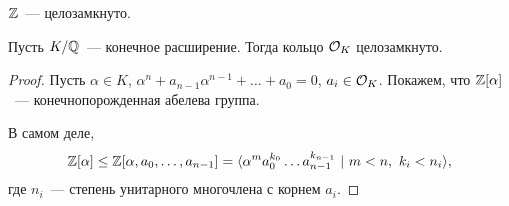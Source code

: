  	\begin{example}
 		$\mathbb{Z}$~--- целозамкнуто. 
 	\end{example}

 	\begin{theorem} 
 		Пусть $K/\mathbb{Q}$~--- конечное расширение. Тогда кольцо $\mathcal{O}_{K}$ целозамкнуто. 
 	\end{theorem}
 	\begin{proof}
 		Пусть $\alpha \in K$, $\alpha^n + a_{n - 1}\alpha^{n - 1} + \ldots + a_0 = 0$, $a_i \in \mathcal{O}_{K}$. Покажем, что $\mathbb{Z}[\alpha]$~--- конечнопорожденная абелева группа. 

 		В самом деле, 
 		\[
 			\mathbb{Z}[\alpha] \le \mathbb{Z}[\alpha, a_0, \ldots, a_{n - 1}] = \langle \alpha^m a_0^{k_0} \ldots a_{n - 1}^{k_{n - 1}}\ \vert \ m < n, \ k_i < n_i \rangle, 
 		\]
 		где $n_i$~--- степень унитарного многочлена с корнем $a_i$.
 	\end{proof}


